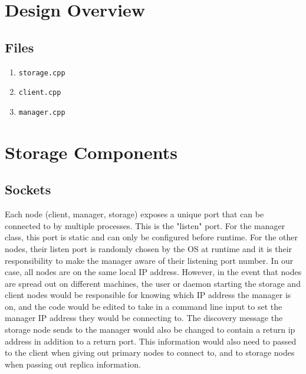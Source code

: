 \documentclass{article}
\begin{document}
\section{Design Overview}
\subsection{Files}
\begin{enumerate}
    \item \texttt{storage.cpp}
    \item \texttt{client.cpp}
    \item \texttt{manager.cpp}
\end{enumerate}

\section{Storage Components}
\subsection{Sockets}
Each node (client, manager, storage) exposes a unique port that can be connected to by multiple processes.
This is the "listen" port. For the manager class, this port is static and can only be configured before runtime.
For the other nodes, their listen port is randomly chosen by the OS at runtime and it is their responsibility to make the manager aware of their listening port number.
In our case, all nodes are on the same local IP address. However, in the event that nodes are spread out on different machines, the user or daemon starting the storage and client
nodes would be responsible for knowing which IP address the manager is on, and the code would be edited to take in a command line input to set the manager IP address
they would be connecting to. The discovery message the storage node sends to the manager would also be changed to contain a return ip address in addition to a return port.
This information would also need to passed to the client when giving out primary nodes to connect to, and to storage nodes when passing out replica information.
\end{document}
